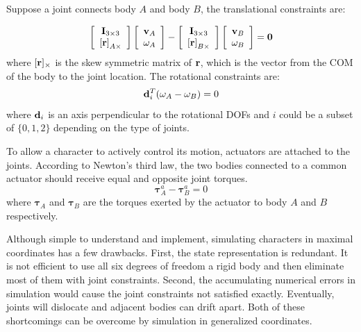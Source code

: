 Suppose a joint connects body $A$ and body $B$, the translational constraints are:

\begin{displaymath}
\left[\begin{array}{c}
\mathbf{I}_{3\times 3}\\
\mathbf{[r]}_{A\times}
\end{array}\right]
\left[\begin{array}{c}
\mathbf{v}_A \\
\mathbf{\omega}_A
\end{array}\right]-
\left[\begin{array}{c}
\mathbf{I}_{3\times 3}\\
\mathbf{[r]}_{B\times}
\end{array}\right]
\left[\begin{array}{c}
\mathbf{v}_B \\
\mathbf{\omega}_B
\end{array}\right]
=\mathbf{0}
\end{displaymath}
where $[\mathbf{r}]_\times$ is the skew symmetric matrix of $\mathbf{r}$, which is the vector from the COM of the body to the joint location. The rotational constraints are:
\begin{displaymath}
\mathbf{d}_i^T(\mathbf{\omega}_A-\mathbf{\omega}_B)=0
  \end{displaymath}
where $\mathbf{d}_i$ is an axis perpendicular to the rotational DOFs and $i$ could be a subset of $\{0,1,2\}$ depending on the type of joints. 

To allow a character to actively control its motion, actuators are attached to the joints. According to Newton's third law, the two bodies connected to a common actuator should receive equal and opposite joint torques.
\begin{displaymath}
\boldsymbol{\tau}^a_A-\boldsymbol{\tau}^a_B=0
\label{eq:actuatorConstraint}
\end{displaymath}
where $\boldsymbol{\tau}_A$ and $\boldsymbol{\tau}_B$ are the torques exerted by the actuator to body $A$ and $B$ respectively.

Although simple to understand and implement, simulating characters in maximal coordinates has a few drawbacks. First, the state representation is redundant. It is not efficient to use all six degrees of freedom a rigid body and then eliminate most of them with joint constraints. Second, the accumulating numerical errors in simulation would cause the joint constraints not satisfied exactly. Eventually, joints will dislocate and adjacent bodies can drift apart. Both of these shortcomings can be overcome by simulation in generalized coordinates.

